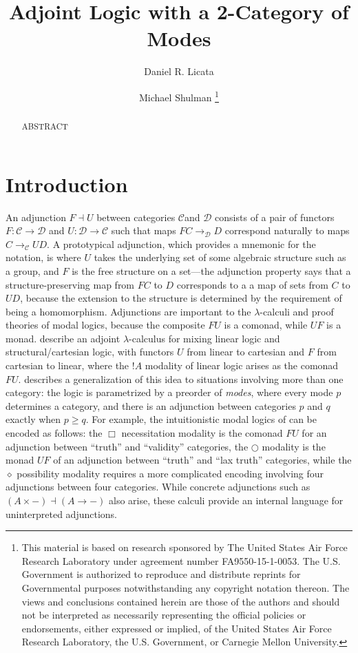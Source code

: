\documentclass{drl-common/llncs}
\title{Adjoint Logic with a 2-Category of Modes}
\author{Daniel R. Licata\inst{1} \and Michael Shulman\inst{2}
\thanks{
This material is based on research sponsored by The United States Air
Force Research Laboratory under agreement number FA9550-15-1-0053. The
U.S. Government is authorized to reproduce and distribute reprints for
Governmental purposes notwithstanding any copyright notation thereon.
The views and conclusions contained herein are those of the authors and
should not be interpreted as necessarily representing the official
policies or endorsements, either expressed or implied, of the United
States Air Force Research Laboratory, the U.S. Government, or Carnegie
Mellon University.
}}
\institute{Wesleyan University \and University of San Diego}
\begin{document}
\maketitle

\begin{abstract}
ABSTRACT
\end{abstract}

\newcommand{\C}{\ensuremath{\mathcal{C}}}
\newcommand{\D}{\ensuremath{\mathcal{D}}}
\newcommand{\la}{\ensuremath{\dashv}}
\newcommand{\arrow}[3]{\ensuremath{#2 \longrightarrow_{#1} #3}}
\newcommand{\sh}{\text{\textesh}}

\section{Introduction}

An adjunction $F \la U$ between categories \C and \D\/ consists of a
pair of functors $F : \C \to \D$ and $U : \D \to \C$ such that maps
\arrow{\D}{F C}{D} correspond naturally to maps \arrow{\C}{C}{U D}.  A
prototypical adjunction, which provides a mnemonic for the notation, is
where $U$ takes the underlying set of some algebraic structure such as a
group, and $F$ is the free structure on a set---the adjunction property
says that a structure-preserving map from $F C$ to $D$ corresponds to a
a map of sets from $C$ to $U D$, because the extension to the structure
is determined by the requirement of being a homomorphism.  Adjunctions
are important to the $\lambda$-calculi and proof theories of modal
logics, because the composite $FU$ is a comonad, while $UF$ is a monad.
\citet{bentonwadler96adjoint} describe an adjoint $\lambda$-calculus for
mixing linear logic and structural/cartesian logic, with functors $U$
from linear to cartesian and $F$ from cartesian to linear, where the $!
A$ modality of linear logic arises as the comonad $FU$.
\citet{reed09adjoint} describes a generalization of this idea to
situations involving more than one category: the logic is parametrized
by a preorder of \emph{modes}, where every mode $p$ determines a
category, and there is an adjunction between categories $p$ and $q$
exactly when $p \ge q$.  For example, the intuitionistic modal logics of
\citet{pfenningdavies} can be encoded as follows: the $\Box$
necessitation modality is the comonad $FU$ for an adjunction between
``truth'' and ``validity'' categories, the $\bigcirc$ modality is the
monad $UF$ of an adjunction between ``truth'' and ``lax truth''
categories, while the $\diamond$ possibility modality requires a more
complicated encoding involving four adjunctions between four categories.
While concrete adjunctions such as $(A \times -) \la (A \to -)$ also
arise, these calculi provide an internal language for uninterpreted
adjunctions.
\end{document}

